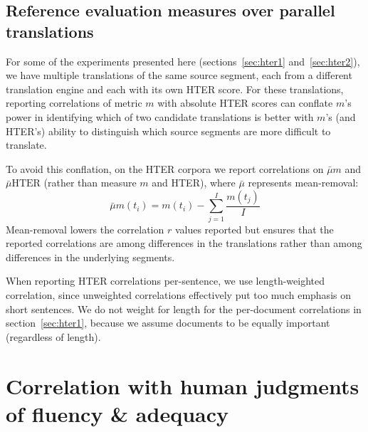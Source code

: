\documentclass{kluwer}    %
\begin{document}
\begin{article}
\subsection{Reference evaluation measures over parallel translations}
\label{sec:metricsreference}
For some of the experiments presented here (sections~\ref{sec:hter1}
and~\ref{sec:hter2}), we have multiple translations of the same source
segment, each from a different translation engine and each with its
own HTER score.  For these translations, reporting correlations of
metric $m$ with absolute HTER scores can conflate $m$'s power in
identifying which of two candidate translations is better with $m$'s
(and HTER's) ability to distinguish which source segments are more
difficult to translate.

To avoid this conflation, on the HTER corpora we report correlations
on $\bar{\mu}m$ and $\bar{\mu}\textrm{HTER}$ (rather than measure
$m$ and HTER), where $\bar{\mu}$ represents mean-removal:
\begin{equation}
  \label{eq:meansub}
  \bar{\mu}m(t_i) = m(t_i) - \sum_{j=1}^I\frac{m(t_j)}{I}
\end{equation}
Mean-removal lowers the correlation $r$ values reported but ensures
that the reported correlations are among differences in the
translations rather than among differences in the underlying segments.

When reporting HTER correlations per-sentence, we use length-weighted
correlation, since unweighted correlations effectively put too much
emphasis on short sentences.  We do not weight for length for the
per-document correlations in section~\ref{sec:hter1}, because we
assume documents to be equally important (regardless of length).

\section{Correlation with human judgments of fluency \& adequacy}
\label{sec:faexpts}


\end{article}
\end{document}
